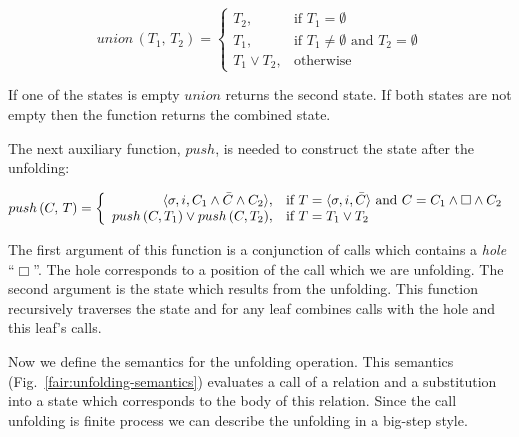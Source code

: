 \[
union\,(T_1,\, T_2) =
\left\{
\begin{array}{rl}
T_2, & \mbox{if } T_1 = \emptyset \\
T_1, & \mbox{if } T_1 \not= \emptyset \mbox{ and } T_2 = \emptyset \\
T_1 \lor T_2, & \mbox{otherwise}
\end{array}
\right.
\]


If one of the states is empty $union$ returns the second state. If both states are not empty then the function returns the combined state.

The next auxiliary function, $push$, is needed to construct the state after the unfolding:

\[
push\,(C,\, T) =
\left\{
\begin{array}{rl}
\langle \sigma, i, C_1 \land \bar{C} \land C_2 \rangle, & \mbox{if } T = \langle \sigma, i, \bar{C} \rangle \mbox{ and } C = C_1 \land \Box \land C_2 \\
push\,(C, T_1) \lor push\,(C, T_2), & \mbox{if } T = T_1 \lor T_2
\end{array}
\right.
\]


The first argument of this function is a conjunction of calls which contains a \emph{hole} ``$\Box$''. The hole corresponds to a position of the call which we are unfolding. 
The second argument is the state which results from the unfolding. This function recursively traverses the state and for any leaf combines calls with the hole and this leaf's calls.

Now we define the semantics for the unfolding operation. This semantics (Fig.~\ref{fair:unfolding-semantics}) evaluates a call of a relation and a substitution into a state which
corresponds to the body of this relation. Since the call unfolding is finite process we can describe the unfolding in a big-step style.


